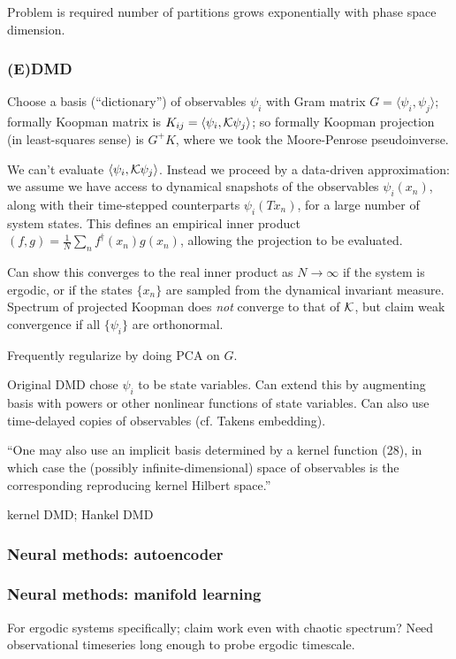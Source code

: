 \documentclass[notitlepage,openany,11pt]{report}
\theoremstyle{plain}%
\numberwithin{equation}{section}
\begin{document}
Problem is required number of partitions grows exponentially with phase space dimension.

\subsubsection{(E)DMD} Choose a basis (``dictionary'') of observables $\psi_{i}$ with Gram matrix $G = \langle \psi_{i}, \psi_{j} \rangle$; formally Koopman matrix is $K_{ij} = \langle \psi_{i}, \mathcal{K} \psi_{j} \rangle$; so formally Koopman projection (in least-squares sense) is $G^{+} K$, where we took the Moore-Penrose pseudoinverse.

We can't evaluate $\langle \psi_{i}, \mathcal{K} \psi_{j} \rangle$. Instead we proceed by a data-driven approximation: we assume we have access to dynamical snapshots of the observables $\psi_{i} (x_{n})$, along with their time-stepped counterparts $\psi_{i} (Tx_{n})$, for a large number of system states. This defines an empirical inner product $(f,g) = \frac{1}{N} \sum_{n} f^{\dagger}(x_{n}) g(x_{n})$, allowing the projection to be evaluated. 

Can show this converges to the real inner product as $N \rightarrow \infty$ if the system is ergodic, or if the states $\{ x_{n} \}$ are sampled from the dynamical invariant measure. Spectrum of projected Koopman does \emph{not} converge to that of $\mathcal{K}$, but claim weak convergence if all $\{\psi_{i}\}$ are orthonormal.

Frequently regularize by doing PCA on $G$. 

Original DMD chose $\psi_{i}$ to be state variables. Can extend this by augmenting basis with powers or other nonlinear functions of state variables. Can also use time-delayed copies of observables (cf. Takens embedding). 

``One may also use an implicit basis determined by a kernel function (28), in which case the (possibly infinite-dimensional) space of observables is the corresponding reproducing kernel Hilbert space.''

kernel DMD; Hankel DMD

\subsubsection{Neural methods: autoencoder}

\subsubsection{Neural methods: manifold learning}
For ergodic systems specifically; claim work even with chaotic spectrum? Need observational timeseries long enough to probe ergodic timescale. 
\end{document}
